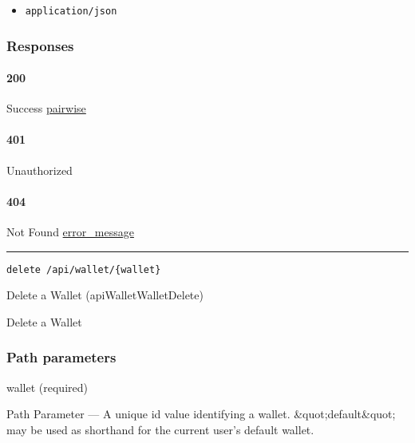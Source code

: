 \begin{itemize}
\tightlist
\item
  \texttt{application/json}
\end{itemize}

\hypertarget{responses-15}{%
\subsubsection{Responses}\label{responses-15}}

\hypertarget{section-50}{%
\paragraph{200}\label{section-50}}

Success \protect\hyperlink{pairwise}{pairwise}

\hypertarget{section-51}{%
\paragraph{401}\label{section-51}}

Unauthorized \protect\hyperlink{}{}

\hypertarget{section-52}{%
\paragraph{404}\label{section-52}}

Not Found \protect\hyperlink{error_message}{error\_message}

\begin{center}\rule{0.5\linewidth}{\linethickness}\end{center}

\protect\hypertarget{apiWalletWalletDelete}{}{}

\begin{verbatim}
delete /api/wallet/{wallet}
\end{verbatim}

Delete a Wallet ({apiWalletWalletDelete})

Delete a Wallet

\hypertarget{path-parameters-9}{%
\subsubsection{Path parameters}\label{path-parameters-9}}

wallet (required)

{Path Parameter} --- A unique id value identifying a wallet.
\&quot;default\&quot; may be used as shorthand for the current user's
default wallet.


